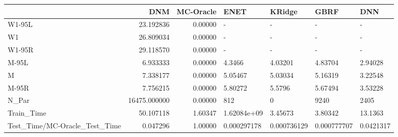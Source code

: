\begin{tabular}{lrrllll}
\toprule
{} &           DNM &  MC-Oracle &         ENET &       KRidge &         GBRF &        DNN \\
\midrule
W1-95L                        &     23.192836 &    0.00000 &            - &            - &            - &          - \\
W1                            &     26.809034 &    0.00000 &            - &            - &            - &          - \\
W1-95R                        &     29.118570 &    0.00000 &            - &            - &            - &          - \\
M-95L                         &      6.933333 &    0.00000 &       4.3466 &      4.03201 &      4.83704 &    2.94028 \\
M                             &      7.338177 &    0.00000 &      5.05467 &      5.03034 &      5.16319 &    3.22548 \\
M-95R                         &      7.756215 &    0.00000 &      5.80272 &       5.5796 &      5.67494 &    3.53228 \\
N\_Par                         &  16475.000000 &    0.00000 &          812 &            0 &         9240 &       2405 \\
Train\_Time                    &     50.107118 &    1.60347 &  1.62084e+09 &      3.45673 &      3.80342 &    13.1363 \\
Test\_Time/MC-Oracle\_Test\_Time &      0.047296 &    1.00000 &  0.000297178 &  0.000736129 &  0.000777707 &  0.0421317 \\
\bottomrule
\end{tabular}
